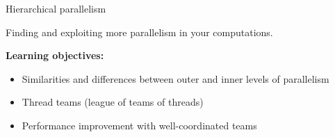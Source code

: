 \begin{comment}
try a scan and fill for fill array?
\end{comment}


\begin{frame}[fragile]

  {\Huge Hierarchical parallelism}

  \vspace{10pt}

  {\large Finding and exploiting more parallelism in your computations.}

  \vspace{20pt}

  \textbf{Learning objectives:}
  \begin{itemize}
    \item {Similarities and differences between outer and inner levels of parallelism}
    \item {Thread teams (league of teams of threads)}
    \item {Performance improvement with well-coordinated teams}
  \end{itemize}

  \vspace{-20pt}

\end{frame}


